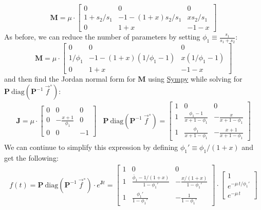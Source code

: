 \documentclass{article}
\newcommand{\finit}{\ensuremath{\vec{f}^\circ}}
\begin{document}
\[
\mathbf{M} = \mu \cdot 
    \begin{bmatrix}
        0 & 0 & 0  \\
        1 + s_2/s_1 & - 1 - (1+x) s_2 / s_1 & x s_2 / s_1 \\
        0 & 1+x  & -1-x
    \end{bmatrix}
\]
As before, we can reduce the number of parameters by setting $\phi_1 \equiv \frac{s_1}{s_1+s_2}$:
\[
\mathbf{M} = \mu \cdot 
    \begin{bmatrix}
        0 & 0 & 0  \\
        1/\phi_1 & - 1 - (1+x)(1/\phi_1-1) & x (1/\phi_1-1) \\
        0 & 1+x  & -1-x
    \end{bmatrix}
\]
and then find the Jordan normal form for $\mathbf{M}$ using \href{https://www.sympy.org/}{Sympy} while solving for $\mathbf{P}~\text{diag}\left(\mathbf{P}^{-1} ~\finit\right)$:
\begin{eqnarray}
\mathbf{J} = \mu \cdot
  \begin{bmatrix}
    0 & 0 & 0 \\
    0 & -\frac{x+1}{\phi_1} & 0 \\
    0 & 0 & -1
\end{bmatrix}
~~~~
\mathbf{P}~\text{diag}\left(\mathbf{P}^{-1} ~\finit\right) =
    \begin{bmatrix}
        1 & 0 & 0 \\
        1 & \frac{\phi_1 - 1}{x + 1 - \phi_1} & -\frac{x}{x + 1 - \phi_1} \\
        1 & \frac{\phi_1}{x + 1 - \phi_1} & -\frac{x+1}{x + 1 - \phi_1} 
    \end{bmatrix}
\end{eqnarray}
We can continue to simplify this expression by defining $\phi_1' \equiv \phi_1/(1+x)$ and get the following:
\begin{eqnarray}
    f(t) = \mathbf{P}~\text{diag}\left(\mathbf{P}^{-1} ~\finit\right) \cdot e^{\mathbf{J}t} = 
    \begin{bmatrix}
        1 & 0 & 0 \\
        1 & \frac{\bar{\phi}_1 - 1/(1+x)}{1 - \phi_1'} & -\frac{x/(1+x)}{1 - \phi_1'} \\
        1 & \frac{\phi_1'}{1 - \phi_1'} & -\frac{1}{1 - \phi_1'}
    \end{bmatrix} \cdot 
    \begin{bmatrix}
        1 \\
        e^{-\mu\,t / \phi_1'} \\
        e^{-\mu\,t}
    \end{bmatrix}
\end{eqnarray}
\end{document}
